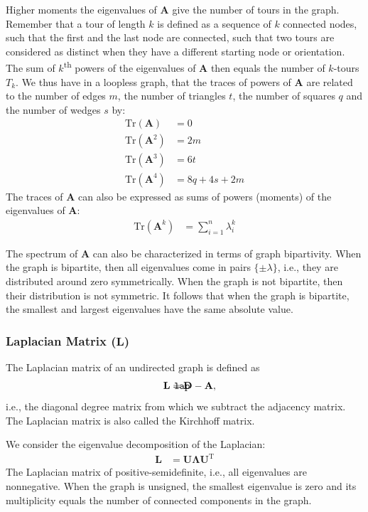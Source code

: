 \documentclass{article}
\def\mathnote#1{%
  \tag*{\rlap{\hspace\marginparsep\smash{\parbox[t]{\marginparwidth}{#1}}}}
}
\begin{document}
Higher moments the eigenvalues of $\mathbf A$ give the number of tours
in the graph.  Remember that a tour of length $k$ is defined as a
sequence of $k$ connected nodes, such that the first and the last node
are connected, such that two tours are considered as distinct when they
have a different starting node or orientation. 
The sum of $k$\textsuperscript{th} powers of the
eigenvalues of $\mathbf A$ then equals the number of $k$-tours $T_k$. 
We thus have in a loopless graph, that the traces of powers of $\mathbf
A$ are related to the number of edges $m$, the number of triangles $t$,
the number of squares $q$ and the number of wedges $s$ by:
\begin{align*}
  \mathrm{Tr}(\mathbf A) &= 0 \\
  \mathrm{Tr}(\mathbf A^2) &= 2m \\
  \mathrm{Tr}(\mathbf A^3) &= 6t \\
  \mathrm{Tr}(\mathbf A^4) &= 8q + 4s + 2m
\end{align*}
The traces of $\mathbf A$ can also be expressed as sums of powers
(moments) of the eigenvalues of $\mathbf A$:
\begin{align*}
  \mathrm{Tr}(\mathbf A^k) &= \sum_{i=1}^n \lambda_i^k
\end{align*}

The spectrum of $\mathbf A$ can also be characterized in terms of graph
bipartivity.  When the graph is bipartite, then all eigenvalues come in
pairs $\{\pm\lambda\}$, i.e., they are distributed around zero
symmetrically.  When the graph is not bipartite, then their distribution
is not symmetric.  It follows that when the graph is bipartite, the
smallest and largest eigenvalues have the same absolute value. 

\subsubsection{Laplacian Matrix ($\mathbf L$)}
The Laplacian matrix of an undirected graph is defined as
\begin{align*}
  \mathnote{\texttt{lap}}
  \mathbf L &= \mathbf D - \mathbf A,
\end{align*}
i.e., the diagonal degree matrix from which we subtract the adjacency
matrix.  The Laplacian matrix is also called the Kirchhoff matrix. 

We consider the eigenvalue decomposition of the Laplacian:
\begin{align*}
  \mathbf L &= \mathbf U \mathbf \Lambda \mathbf U^{\mathrm T}
\end{align*}
The Laplacian matrix of positive-semidefinite, i.e., all eigenvalues are
nonnegative.  
When the graph is unsigned, the smallest eigenvalue is zero and its
multiplicity equals the number of connected components in the graph. 
\end{document}
